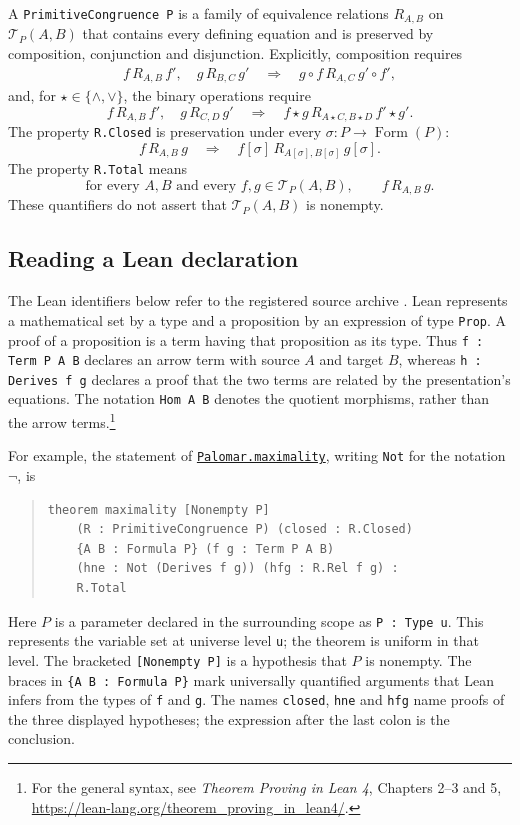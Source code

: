 \documentclass[11pt]{article}
\newcommand{\FormulaSet}{\operatorname{Form}}
\begin{document}
A \texttt{PrimitiveCongruence P} is a family of equivalence relations
$R_{A,B}$ on $\mathcal T_P(A,B)$ that contains every defining equation
and is preserved by composition, conjunction and disjunction.
Explicitly, composition requires
\[
 \begin{gathered}
 f\,R_{A,B}\,f',\quad g\,R_{B,C}\,g'
 \quad\Longrightarrow\quad
 g\circ f\,R_{A,C}\,g'\circ f',
 \end{gathered}
\]
and, for $\star\in\{\wedge,\vee\}$, the binary operations require
\[
 f\,R_{A,B}\,f',\quad g\,R_{C,D}\,g'
 \quad\Longrightarrow\quad
 f\star g\,R_{A\star C,B\star D}\,f'\star g'.
\]
The property \texttt{R.Closed} is preservation under every
$\sigma:P\to\FormulaSet(P)$:
\[
 f\,R_{A,B}\,g
 \quad\Longrightarrow\quad
 f[\sigma]\,R_{A[\sigma],B[\sigma]}\,g[\sigma].
\]
The property \texttt{R.Total} means
\[
 \text{for every }A,B\text{ and every }f,g\in\mathcal T_P(A,B),
 \qquad f\,R_{A,B}\,g.
\]
These quantifiers do not assert that $\mathcal T_P(A,B)$ is nonempty.

\subsection{Reading a Lean declaration}\label{app:reading-lean}

The Lean identifiers below refer to the registered source archive
\cite{palomar-2026-10-30-000014-v2}.
Lean represents a mathematical set by a type and a proposition by
an expression of type \texttt{Prop}. A proof of a proposition is a
term having that proposition as its type. Thus
\texttt{f : Term P A B} declares an arrow term with source $A$
and target $B$, whereas \texttt{h : Derives f g} declares a proof
that the two terms are related by the presentation's equations.
The notation \texttt{Hom A B} denotes the quotient morphisms, rather
than the arrow terms.\footnote{\raggedright For the general syntax, see
\emph{Theorem Proving in Lean 4}, Chapters 2--3 and 5,
\url{https://lean-lang.org/theorem_proving_in_lean4/}.}

For example, the statement of \href{https://github.com/flengyel/Dosen-Petric-Maximality/blob/5dbee39bea09539bd130f729e82636419f71f920/DosenPetric/PalomarMaximality.lean\#L17}{\texttt{Palomar.maximality}},
writing \texttt{Not} for the notation $\neg$, is
\begin{quote}
\begin{verbatim}
theorem maximality [Nonempty P]
    (R : PrimitiveCongruence P) (closed : R.Closed)
    {A B : Formula P} (f g : Term P A B)
    (hne : Not (Derives f g)) (hfg : R.Rel f g) :
    R.Total
\end{verbatim}
\end{quote}
Here $P$ is a parameter declared in the surrounding scope as
\texttt{P : Type u}. This represents the variable set at universe
level \texttt{u}; the theorem is uniform in that level.
The bracketed \texttt{[Nonempty P]} is a hypothesis that $P$ is
nonempty. The braces in \texttt{\{A B : Formula P\}} mark
universally quantified arguments that Lean infers from the types
of \texttt{f} and \texttt{g}.
The names \texttt{closed}, \texttt{hne} and \texttt{hfg} name
proofs of the three displayed hypotheses; the expression after
the last colon is the conclusion.
\end{document}
